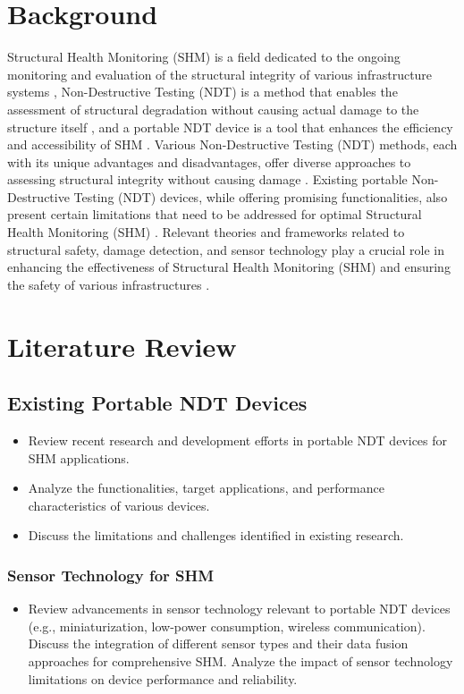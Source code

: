 \documentclass[journal, a4paper]{IEEEtran}
\begin{document}
\section{Background}
Structural Health Monitoring (SHM) is a field dedicated to the ongoing monitoring and evaluation of the structural integrity
of various infrastructure systems \cite{Katam2023}, Non-Destructive Testing (NDT) is a method that enables the assessment
of structural degradation without causing actual damage to the structure itself \cite{Katam2023},
and a portable NDT device is a tool that enhances the efficiency and accessibility of SHM \cite{Hassani2023} \cite{Katam2023}.
Various Non-Destructive Testing (NDT) methods, each with its unique advantages and disadvantages,
offer diverse approaches to assessing structural integrity without causing damage \cite{Dolati2021} \cite{Verma2013}.
Existing portable Non-Destructive Testing (NDT) devices, while offering promising functionalities,
also present certain limitations that need to be addressed for optimal Structural Health Monitoring (SHM) \cite{Hassani2023} \cite{Zhu2011}.
Relevant theories and frameworks related to structural safety, damage detection,
and sensor technology play a crucial role in enhancing the effectiveness of Structural Health Monitoring (SHM)
and ensuring the safety of various infrastructures \cite{Chen2021} \cite{Gharehbaghi2022}.


\section{Literature Review}

\subsection{Existing Portable NDT Devices}
\begin{itemize}
  \item Review recent research and development efforts in portable NDT devices for SHM applications.
  \item Analyze the functionalities, target applications, and performance characteristics of various devices.
  \item Discuss the limitations and challenges identified in existing research.
\end{itemize}

\subsubsection{Sensor Technology for SHM}
\begin{itemize}
  \item Review advancements in sensor technology relevant to portable NDT devices (e.g., miniaturization, low-power consumption, wireless communication).
  Discuss the integration of different sensor types and their data fusion approaches for comprehensive SHM.
  Analyze the impact of sensor technology limitations on device performance and reliability.
\end{itemize}
\end{document}
